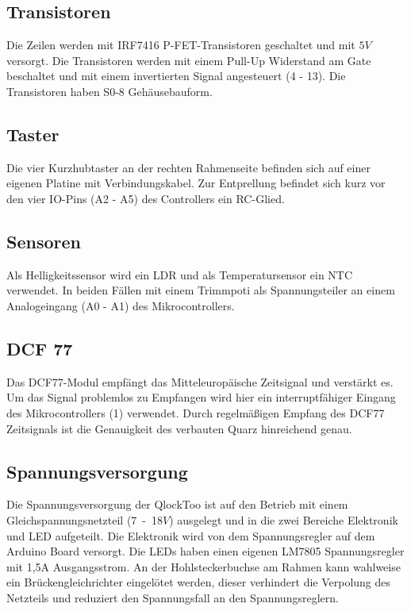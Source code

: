 \begin{multicols}{2}
\subsection{Transistoren}
Die Zeilen werden mit IRF7416 P-FET-Transistoren geschaltet und mit $5V$ versorgt. Die Transistoren werden mit einem Pull-Up Widerstand am Gate beschaltet und mit einem invertierten Signal angesteuert (4 - 13). Die Transistoren haben S0-8 Gehäusebauform. 
\subsection{Taster}
Die vier Kurzhubtaster an der rechten Rahmenseite befinden sich auf einer eigenen Platine mit Verbindungskabel. Zur Entprellung befindet sich kurz vor den vier IO-Pins (A2 - A5) des Controllers ein RC-Glied. 
\subsection{Sensoren}
Als Helligkeitssensor wird ein LDR und als Temperatursensor ein NTC verwendet. In beiden Fällen mit einem Trimmpoti als Spannungsteiler an einem Analogeingang (A0 - A1) des Mikrocontrollers.
\subsection{DCF 77}
Das DCF77-Modul empfängt das Mitteleuropäische Zeitsignal und verstärkt es. Um das Signal problemlos zu Empfangen wird hier ein interruptfähiger Eingang des Mikrocontrollers (1) verwendet. Durch regelmäßigen Empfang des DCF77 Zeitsignals ist die Genauigkeit des verbauten Quarz hinreichend genau.
\subsection{Spannungsversorgung}
Die Spannungsversorgung der QlockToo ist auf den Betrieb mit einem Gleichspannungsnetzteil (7~-~18$V$) ausgelegt und in die zwei Bereiche Elektronik und LED aufgeteilt. Die Elektronik wird von dem Spannungsregler auf dem Arduino Board versorgt. Die LEDs haben einen eigenen LM7805 Spannungsregler mit 1,5A Ausgangsstrom. An der Hohlsteckerbuchse am Rahmen kann wahlweise ein Brückengleichrichter eingelötet werden, dieser verhindert die Verpolung des Netzteils und reduziert den Spannungsfall an den Spannungsreglern.

\end{multicols}


